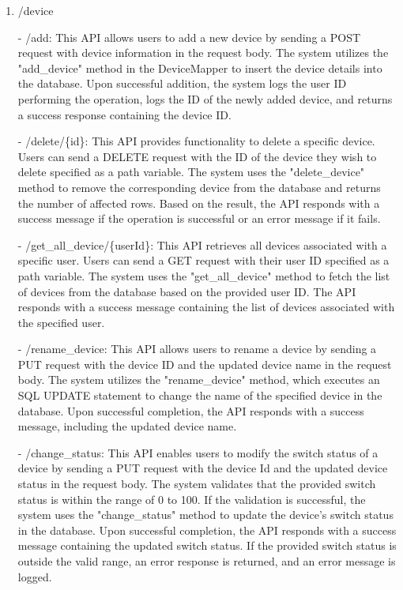 \begin{enumerate}
    \item /device
    \item[-] /add: This API allows users to add a new device by sending a POST request with device information in the request body. The system utilizes the "add\_device" method in the DeviceMapper to insert the device details into the database. Upon successful addition, the system logs the user ID performing the operation, logs the ID of the newly added device, and returns a success response containing the device ID.\\
    \item[-] /delete/\{id\}: This API provides functionality to delete a specific device. Users can send a DELETE request with the ID of the device they wish to delete specified as a path variable. The system uses the "delete\_device" method to remove the corresponding device from the database and returns the number of affected rows. Based on the result, the API responds with a success message if the operation is successful or an error message if it fails.\\
    \item[-] /get\_all\_device/\{userId\}: This API retrieves all devices associated with a specific user. Users can send a GET request with their user ID specified as a path variable. The system uses the "get\_all\_device" method to fetch the list of devices from the database based on the provided user ID. The API responds with a success message containing the list of devices associated with the specified user.\\
    \item[-] /rename\_device: This API allows users to rename a device by sending a PUT request with the device ID and the updated device name in the request body. The system utilizes the "rename\_device" method, which executes an SQL UPDATE statement to change the name of the specified device in the database. Upon successful completion, the API responds with a success message, including the updated device name.\\
    \item[-] /change\_status: This API enables users to modify the switch status of a device by sending a PUT request with the device Id and the updated device status in the request body. The system validates that the provided switch status is within the range of 0 to 100. If the validation is successful, the system uses the "change\_status" method to update the device's switch status in the database. Upon successful completion, the API responds with a success message containing the updated switch status. If the provided switch status is outside the valid range, an error response is returned, and an error message is logged.\\


\end{enumerate}
